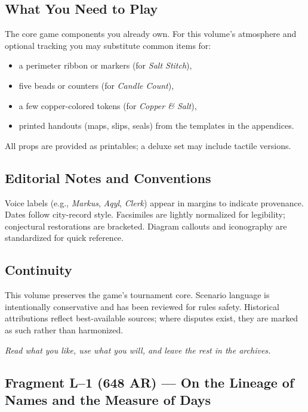 \documentclass[11pt]{article}
\begin{document}
\subsection*{What You Need to Play}
The core game components you already own. For this volume’s atmosphere and optional tracking you may substitute common items for:
\begin{itemize}
  \item a perimeter ribbon or markers (for \emph{Salt Stitch}),
  \item five beads or counters (for \emph{Candle Count}),
  \item a few copper-colored tokens (for \emph{Copper \& Salt}),
  \item printed handouts (maps, slips, seals) from the templates in the appendices.
\end{itemize}
All props are provided as printables; a deluxe set may include tactile versions.

\subsection*{Editorial Notes and Conventions}
Voice labels (e.g., \emph{Markus}, \emph{Aqyl}, \emph{Clerk}) appear in margins to indicate provenance. Dates follow city-record style. Facsimiles are lightly normalized for legibility; conjectural restorations are bracketed. Diagram callouts and iconography are standardized for quick reference.

\subsection*{Continuity}
This volume preserves the game’s tournament core. Scenario language is intentionally conservative and has been reviewed for rules safety. Historical attributions reflect best-available sources; where disputes exist, they are marked as such rather than harmonized.

\medskip
\noindent\textit{Read what you like, use what you will, and leave the rest in the archives.}


\subsection*{Fragment L--1 (648 AR) --- On the Lineage of Names and the Measure of Days}
\label{frag:l1}
{}
\end{document}
